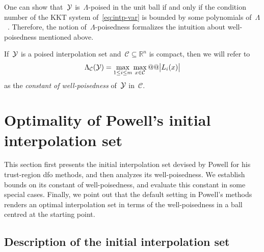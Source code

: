 \documentclass{article}
\numberwithin{equation}{section}
\theoremstyle{definition}
\theoremstyle{plain}
\theoremstyle{remark}
\newcommand*{\abs}[2][]{#1\lvert#2#1\rvert}
\newcommand*{\lagp}[1][]{L\ifblank{#1}{}{_{#1}}}
\newcommand*{\R}{\mathbb{R}}
\newcommand*{\solvername}[1]{\textsc{#1}\xspace}
\newcommand*{\xpt}[1][]{\mathcal{Y}\ifblank{#1}{}{^{#1}}}
\begin{document}
One can show that~$\xpt$ is~$\Lambda$-poised in the unit ball if and only if the condition number of the KKT system of~\eqref{eq:intp-var} is bounded by some polynomials of~$\Lambda$~\cite[Theorem~5.8]{Conn_Scheinberg_Vicente_2009}.
Therefore, the notion of~$\Lambda$-poisedness formalizes the intuition about well-poisedness mentioned above.

If~$\xpt$ is a poised interpolation set and~$\mathcal{C}\subseteq \R^n$ is compact, then we will refer to
\[
    \Lambda_{\mathcal{C}}(\xpt) = \max_{1 \le i \le m} \max_{x \in \mathcal{C}} @@ \abs[\big]{\lagp[i](x)}
\]
as the \emph{constant of well-poisedness} of~$\xpt$ in~$\mathcal{C}$.

\section{Optimality of Powell's initial interpolation set}
\label{sec:main-result}

This section first presents the initial interpolation set devised by Powell for his trust-region \gls{dfo} methods, and then analyzes its well-poisedness.
We establish bounds on its constant of well-poisedness, and evaluate this constant in some special cases.
Finally, we point out that the default setting in Powell's methods renders an optimal interpolation set in terms of the well-poisedness in a ball centred at the starting point.

\subsection{Description of the initial interpolation set}
\label{subsec:powell-set}
\end{document}
